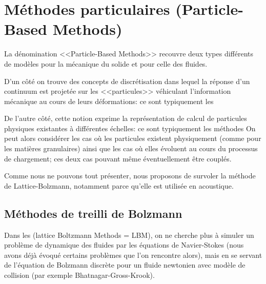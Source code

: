 \medskip
\section{Méthodes particulaires (Particle-Based Methods)}\label{Sec-PBM}

La dénomination <<Particle-Based Methods>> recouvre deux types différents de modèles
pour la mécanique du solide et pour celle des fluides.

D'un côté on trouve des concepts de discrétisation dans lequel la réponse d'un continuum 
est projetée sur les <<particules>> véhiculant l'information mécanique au cours de leurs déformations:
ce sont typiquement les 

De l'autre côté, cette notion exprime la représentation de calcul de particules physiques existantes 
à différentes échelles: ce sont typiquement les méthodes 
On peut alors considérer les cas où les particules existent physiquement (comme pour les matières granulaires)
ainsi que les cas où elles évoluent au cours du processus de chargement; ces deux cas pouvant même
éventuellement être couplés.

\medskip
Comme nous ne pouvons tout présenter, nous proposons de survoler la méthode
de Lattice-Bolzmann, 
notamment parce qu'elle est utilisée en acoustique.

\medskip
\subsection{Méthodes de treilli de Bolzmann}

Dans les  (lattice Boltzmann Methods = LBM), on ne cherche 
plus à simuler un problème de dynamique des fluides par les équations de 
Navier-Stokes 
(nous avons déjà évoqué certains problèmes que l'on rencontre alors), mais en se servant de
l'équation de Bolzmann 
discrète pour un fluide newtonien avec modèle de collision  (par exemple 
Bhatnagar-Gross-Krook).

